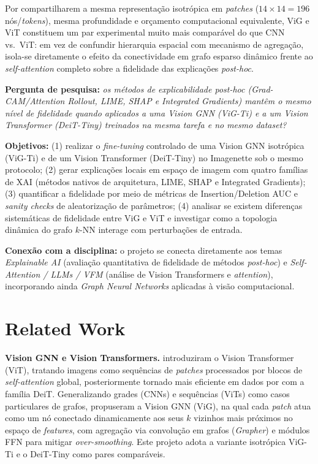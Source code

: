 \documentclass{article}
\begin{document}
Por compartilharem a mesma representação isotrópica em \textit{patches} ($14 \times 14 = 196$ nós/\textit{tokens}), mesma profundidade e orçamento computacional equivalente, ViG e ViT constituem um par experimental muito mais comparável do que CNN vs.\ ViT: em vez de confundir hierarquia espacial com mecanismo de agregação, isola-se diretamente o efeito da conectividade em grafo esparso dinâmico frente ao \textit{self-attention} completo sobre a fidelidade das explicações \textit{post-hoc}.

\textbf{Pergunta de pesquisa:} \textit{os métodos de explicabilidade post-hoc (Grad-CAM/Attention Rollout, LIME, SHAP e Integrated Gradients) mantêm o mesmo nível de fidelidade quando aplicados a uma Vision GNN (ViG-Ti) e a um Vision Transformer (DeiT-Tiny) treinados na mesma tarefa e no mesmo dataset?}

\textbf{Objetivos:} (1) realizar o \textit{fine-tuning} controlado de uma Vision GNN isotrópica (ViG-Ti) e de um Vision Transformer (DeiT-Tiny) no Imagenette sob o mesmo protocolo; (2) gerar explicações locais em espaço de imagem com quatro famílias de XAI (métodos nativos de arquitetura, LIME, SHAP e Integrated Gradients); (3) quantificar a fidelidade por meio de métricas de Insertion/Deletion AUC e \textit{sanity checks} de aleatorização de parâmetros; (4) analisar se existem diferenças sistemáticas de fidelidade entre ViG e ViT e investigar como a topologia dinâmica do grafo $k$-NN interage com perturbações de entrada.

\textbf{Conexão com a disciplina:} o projeto se conecta diretamente aos temas \textit{Explainable AI} (avaliação quantitativa de fidelidade de métodos \textit{post-hoc}) e \textit{Self-Attention / LLMs / VFM} (análise de Vision Transformers e \textit{attention}), incorporando ainda \textit{Graph Neural Networks} aplicadas à visão computacional.

\section{Related Work}
\label{sec:related}

\textbf{Vision GNN e Vision Transformers.} \citet{dosovitskiy2021vit} introduziram o Vision Transformer (ViT), tratando imagens como sequências de \textit{patches} processados por blocos de \textit{self-attention} global, posteriormente tornado mais eficiente em dados por \citet{touvron2021deit} com a família DeiT. Generalizando grades (CNNs) e sequências (ViTs) como casos particulares de grafos, \citet{han2022vig} propuseram a Vision GNN (ViG), na qual cada \textit{patch} atua como um nó conectado dinamicamente aos seus $k$ vizinhos mais próximos no espaço de \textit{features}, com agregação via convolução em grafos (\textit{Grapher}) e módulos FFN para mitigar \textit{over-smoothing}. Este projeto adota a variante isotrópica ViG-Ti e o DeiT-Tiny como pares comparáveis.
\end{document}
